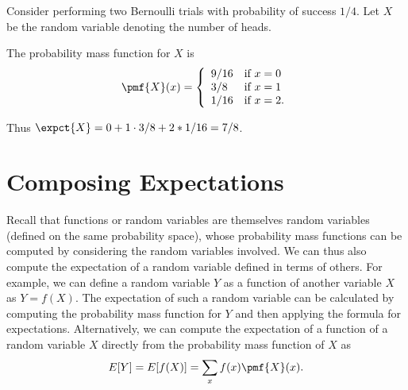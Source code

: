 \begin{flex}
\begin{example}
\end{example}

\begin{example}
\label{xmpl:probability::expectation::consider}
Consider performing two Bernoulli trials with probability of success $1/4$.
Let $X$ be the random variable denoting the number of heads.

The probability mass function for $X$ is
\[
\pmf{X}(x) = 
\left\{
\begin{array}{ll}
9/16 & \mbox{if}~x = 0
\\
3/8 & \mbox{if}~x = 1
\\
1/16 & \mbox{if}~x = 2.
\end{array}
\right.
\]

Thus $\expct{X} = 0 + 1 \cdot 3/8 + 2 * 1/16 = 7/8$.

\end{example}
\end{flex}


\section{Composing Expectations}
\label{sec:probability::expectation::compose}

\begin{cluster}
\label{grp:grm:probability::expectation::recall}

\begin{gram}
\label{grm:probability::expectation::recall}
\label{sec:probability::expectation::compose}
\begin{gram}
Recall that functions or random variables are themselves random
variables (defined on the same probability space), whose probability
mass functions can be computed by considering the random variables
involved.
We can thus also compute the expectation of a random variable defined
in terms of others.
For example, we can define a random variable $Y$ as a function of
another variable $X$ as $Y = f(X)$.
The expectation of such a random variable can be calculated by
computing the probability mass function for $Y$ and then applying the
formula for expectations.
Alternatively, we can compute the expectation of a function of a
random variable $X$ directly from the probability mass function of $X$
as
\[
E[Y] = E[f(X)] = \sum_{x}{f(x) \pmf{X}(x)}.
\] 
\end{gram}

\end{gram}
\end{cluster}

